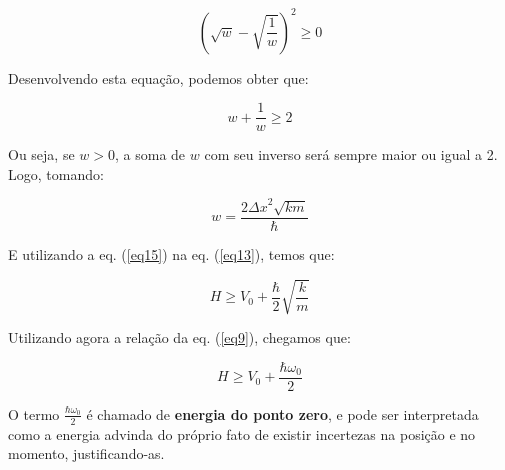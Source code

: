 \begin{equation}
    \left(\sqrt{w} - \sqrt{\frac{1}{w}} \right)^2 \geq 0   \label{eq14}
\end{equation}

Desenvolvendo esta equação, podemos obter que:

\begin{equation}
    w + \frac{1}{w} \geq 2   \label{eq15}
\end{equation}

Ou seja, se $w > 0$, a soma de $w$ com seu inverso será sempre maior ou igual a 2. Logo, tomando:

\begin{equation}
    w = \frac{2{\Delta x}^2 \sqrt{km}}{\hbar}   \label{eq16}
\end{equation}

E utilizando a eq. (\ref{eq15}) na eq. (\ref{eq13}), temos que:

\begin{equation}
    H \geq V_0 + \frac{\hbar}{2}\sqrt{\frac{k}{m}}   \label{eq17}
\end{equation}

Utilizando agora a relação da eq. (\ref{eq9}), chegamos que:

\begin{equation}
    H \geq V_0 + \frac{\hbar {\omega}_0}{2}   \label{eq18}
\end{equation}

O termo $\frac{\hbar {\omega}_0}{2}$ é chamado de \textbf{energia do ponto zero}, e pode ser interpretada como a energia advinda do próprio fato de existir incertezas na posição e no momento, justificando-as.

